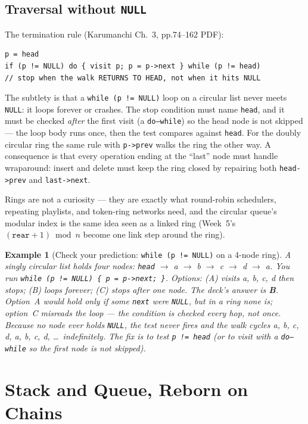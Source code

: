 \documentclass[11pt]{article}
\newtheorem{example}{Example}[section]
\begin{document}
\subsection{Traversal without \texttt{NULL}}

The termination rule (Karumanchi Ch.~3, pp.74--162 PDF):

{\footnotesize
\begin{verbatim}
p = head
if (p != NULL) do { visit p; p = p->next } while (p != head)
// stop when the walk RETURNS TO HEAD, not when it hits NULL
\end{verbatim}
}

The subtlety is that a \texttt{while (p != NULL)} loop on a circular list never meets \texttt{NULL}: it loops forever or crashes. The stop condition must name \texttt{head}, and it must be checked \emph{after} the first visit (a \texttt{do--while}) so the head node is not skipped --- the loop body runs once, then the test compares against \texttt{head}. For the doubly circular ring the same rule with \texttt{p->prev} walks the ring the other way. A consequence is that every operation ending at the ``last'' node must handle wraparound: insert and delete must keep the ring closed by repairing both \texttt{head->prev} and \texttt{last->next}.

Rings are not a curiosity --- they are exactly what round-robin schedulers, repeating playlists, and token-ring networks need, and the circular queue's modular index is the same idea seen as a linked ring (Week~5's $(\texttt{rear} + 1) \bmod n$ become one link step around the ring).

\begin{example}[Check your prediction: \texttt{while (p != NULL)} on a 4-node ring]
A singly circular list holds four nodes: \texttt{head} $\to$ a $\to$ b $\to$ c $\to$ d $\to$ a. You run \texttt{while (p != NULL) \{ p = p->next; \}}. Options: (A) visits a, b, c, d then stops; (B) loops forever; (C) stops after one node. The deck's answer is \textbf{B}. Option~A would hold only if some \texttt{next} were \texttt{NULL}, but in a ring none is; option~C misreads the loop --- the condition is checked every hop, not once. Because no node ever holds \texttt{NULL}, the test never fires and the walk cycles a, b, c, d, a, b, c, d, \dots\ indefinitely. The fix is to test \texttt{p != head} (or to visit with a \texttt{do--while} so the first node is not skipped).
\end{example}

\section{Stack and Queue, Reborn on Chains}
\end{document}
